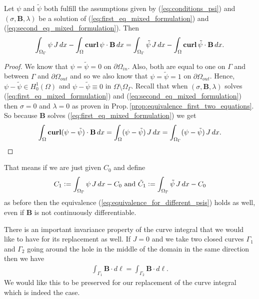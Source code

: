 \documentclass[../master_thesis.tex]{subfiles}
\begin{document}
\begin{proposition}\label{prop:different_psi_same_curve_integral}
    Let $\psi$ and $\tilde{\psi}$ both fulfill the assumptions given by (\ref{eq:conditions_psi})
    and $(\sigma, \mathbf{B}, \lambda)$ be a solution of (\ref{eq:first_eq_mixed_formulation}) and 
    (\ref{eq:second_eq_mixed_formulation}).
    Then 
    \begin{align}
        \int_{\Omega_\Gamma} \psi \, J \, dx -  \int_\Omega \veccurl \psi \cdot \mathbf{B} \, dx
        = \int_{\Omega_\Gamma} \tilde{\psi} \, J \, dx -  \int_\Omega \veccurl \tilde{\psi} \cdot \mathbf{B} \, dx.
        \label{eq:different_psi_same_curve_integral}
    \end{align}
\end{proposition}
\begin{proof}
    We know that $\psi = \tilde{\psi} = 0$ on $\partial \Omega_{in}$. Also,  
    both are equal to one on $\Gamma$ and between $\Gamma$ and $\partial \Omega_{out}$ and so we also 
    know that $\psi = \tilde{\psi} = 1$ on $\partial \Omega_{out}$. Hence, 
    $\psi - \tilde{\psi} \in H^1_0(\Omega)$ and $\psi - \tilde{\psi} \equiv 0$ 
    in $\Omega \setminus \Omega_\Gamma$. 
    Recall that when $(\sigma, \mathbf{B}, \lambda)$ solves 
    (\ref{eq:first_eq_mixed_formulation}) and (\ref{eq:second_eq_mixed_formulation}) 
    then $\sigma = 0$ and $\lambda = 0$ as proven in Prop.\,\ref{prop:equivalence_first_two_equations}.
    So because $\mathbf{B}$ solves 
    (\ref{eq:first_eq_mixed_formulation}) we get 
    \begin{align*}
        \int_\Omega \veccurl (\psi - \tilde{\psi}) \cdot \mathbf{B} \, dx
        = \int_\Omega (\psi - \tilde{\psi}) \, J \, dx 
        = \int_{\Omega_\Gamma} (\psi - \tilde{\psi}) \, J \, dx.
    \end{align*}
\end{proof}
That means if we are just given $C_0$ and define 
\begin{align*}
    C_1 \vcentcolon= \int_{\Omega_\Gamma} \psi \, J \, dx - C_0 \text{ and }
    \tilde{C}_1 \vcentcolon= \int_{\Omega_\Gamma} \tilde{\psi} \, J \, dx - C_0
\end{align*}
as before then the equivalence (\ref{eq:equivalence_for_different_psis}) holds as well, 
even if $\mathbf{B}$ is not continuously 
differentiable.

There is an important invariance property of the curve integral that we would like 
to have for its replacement as well. If $J = 0$ and 
we take two closed curves $\Gamma_1$ and $\Gamma_2$ going around the 
hole in the middle of the domain in the same direction then
we have 
\begin{align}
    \int_{\Gamma_1} \mathbf{B} \cdot d\ell = \int_{\Gamma_2} \mathbf{B} \cdot d\ell.
\end{align}
We would like this to be preserved for our replacement of the curve integral 
which is indeed the case.
\end{document}
